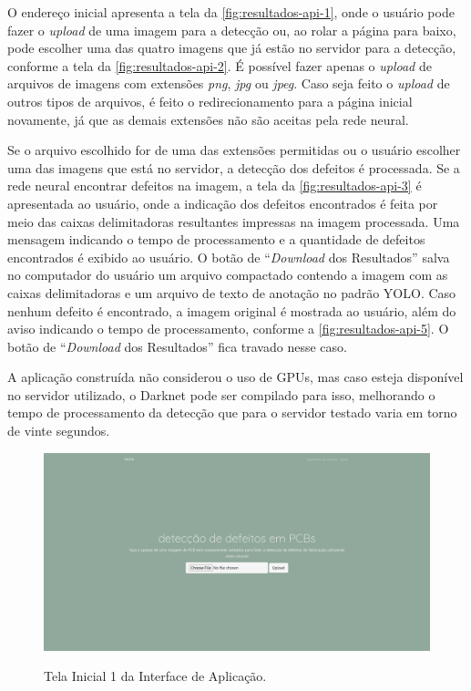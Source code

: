 \begin{figure}[H]
  \label{fig:resultados-api-etapas}
\end{figure}

O endereço inicial apresenta a tela da \autoref{fig:resultados-api-1}, onde o usuário pode fazer o \textit{upload} de uma imagem para a detecção ou, ao rolar a página para baixo, pode escolher uma das quatro imagens que já estão no servidor para a detecção, conforme a tela da \autoref{fig:resultados-api-2}. É possível fazer apenas o \textit{upload} de arquivos de imagens com extensões \textit{png}, \textit{jpg} ou \textit{jpeg}. Caso seja feito o \textit{upload} de outros tipos de arquivos, é feito o redirecionamento para a página inicial novamente, já que as demais extensões não são aceitas pela rede neural.

Se o arquivo escolhido for de uma das extensões permitidas ou o usuário escolher uma das imagens que está no servidor, a detecção dos defeitos é processada. Se a rede neural encontrar defeitos na imagem, a tela da \autoref{fig:resultados-api-3} é apresentada ao usuário, onde a indicação dos defeitos encontrados é feita por meio das caixas delimitadoras resultantes impressas na imagem processada. Uma mensagem indicando o tempo de processamento e a quantidade de defeitos encontrados é exibido ao usuário. O botão de ``\textit{Download} dos Resultados'' salva no computador do usuário um arquivo compactado contendo a imagem com as caixas delimitadoras e um arquivo de texto de anotação no padrão YOLO. Caso nenhum defeito é encontrado, a imagem original é mostrada ao usuário, além do aviso indicando o tempo de processamento, conforme a \autoref{fig:resultados-api-5}. O botão de ``\textit{Download} dos Resultados'' fica travado nesse caso.

A aplicação construída não considerou o uso de GPUs, mas caso esteja disponível no servidor utilizado, o Darknet pode ser compilado para isso, melhorando o tempo de processamento da detecção que para o servidor testado varia em torno de vinte segundos.

\begin{landscape}
  \begin{figure}[H] %
    \centering
    \caption{Tela Inicial 1 da Interface de Aplicação.}
    \includegraphics[scale=0.36]{img/api/1.png}
    \label{fig:resultados-api-1}
  \end{figure}
\end{landscape}

